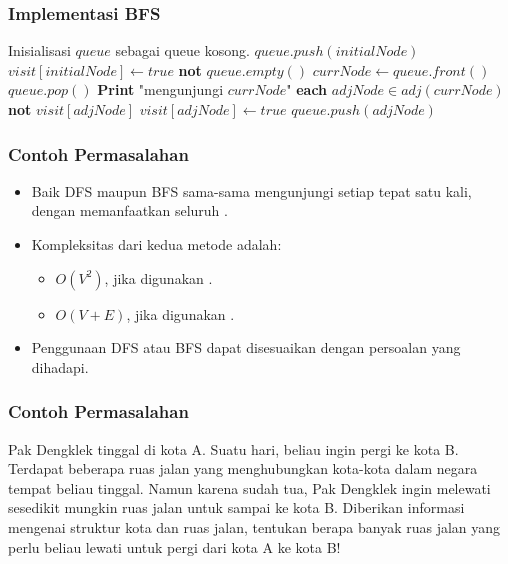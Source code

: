 \begin{frame}[fragile]
\frametitle{Implementasi BFS}
%
%        
\begin{codebox}
  \li \Comment Inisialisasi $queue$ sebagai queue kosong.
  \li $queue.push(initialNode)$
  \li $visit[initialNode] \gets true$
  \li \While \textbf{not} $queue.empty()$ \Do
  \li   $currNode \gets queue.front()$
  \li   $queue.pop()$
  \li   \textbf{Print} "mengunjungi $currNode$"
  \li   \For \textbf{each} $adjNode \in adj(currNode)$ \Do
  \li     \If \textbf{not} $visit[adjNode]$ \Then
  \li       $visit[adjNode] \gets true$
  \li       $queue.push(adjNode)$
          \End
        \End
      \End
\end{codebox}
\end{frame}

\begin{frame}
\frametitle{Contoh Permasalahan}
\begin{itemize}
  \item Baik DFS maupun BFS sama-sama mengunjungi setiap \fnode tepat satu kali, dengan memanfaatkan seluruh \fedge.
  \item Kompleksitas dari kedua metode adalah:
  \begin{itemize}
    \item $O(V^2)$, jika digunakan \fadjacencymatrix.
    \item $O(V + E)$, jika digunakan \fadjacencylist.
    \newline
  \end{itemize}
  \item Penggunaan DFS atau BFS dapat disesuaikan dengan persoalan yang dihadapi.
\end{itemize}
\end{frame}

\begin{frame}
\frametitle{Contoh Permasalahan}
Pak Dengklek tinggal di kota A. Suatu hari, beliau ingin pergi ke kota B. Terdapat beberapa ruas jalan yang menghubungkan kota-kota dalam negara tempat beliau tinggal. Namun karena sudah tua, Pak Dengklek ingin melewati sesedikit mungkin ruas jalan untuk sampai ke kota B.
\newline\newline
Diberikan informasi mengenai struktur kota dan ruas jalan, tentukan berapa banyak ruas jalan yang perlu beliau lewati untuk pergi dari kota A ke kota B!
\end{frame}

